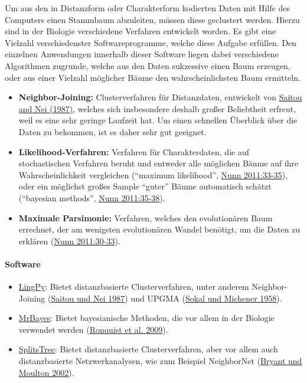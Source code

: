 Um aus den in Distanzform oder Charakterform kodierten Daten mit Hilfe
des Computers einen Stammbaum abzuleiten, müssen diese geclustert
werden. Hierzu sind in der Biologie verschiedene Verfahren entwickelt
worden. Es gibt eine Vielzahl verschiedenster Softwareprogramme, welche
diese Aufgabe erfüllen. Den einzelnen Anwendungen innerhalb dieser
Software liegen dabei verschiedene Algorithmen zugrunde, welche aus den
Daten sukzessive einen Baum erzeugen, oder aus einer Vielzahl möglicher
Bäume den wahrscheinlichsten Baum ermitteln.




\begin{itemize}
\itemsep1pt\parskip0pt
\item
  \textbf{Neighbor-Joining:} Clusterverfahren für Distanzdaten,
  entwickelt von
  \href{http://bibliography.lingpy.org?key=Saitou1987}{Saitou and Nei
  (1987)}, welches sich insbesondere deshalb großer Beliebtheit erfreut,
  weil es eine sehr geringe Laufzeit hat. Um einen schnellen Überblick
  über die Daten zu bekommen, ist es daher sehr gut geeignet.
\item
  \textbf{Likelihood-Verfahren:} Verfahren für Charakterdaten, die auf
  stochastischen Verfahren beruht und entweder alle möglichen Bäume auf
  ihre Wahrscheinlichkeit vergleichen (``maximum likelihood'',
  \href{http://bibliography.lingpy.org?key=Nunn2011}{Nunn 2011:33-35}),
  oder ein möglichst großes Sample ``guter'' Bäume automatisch schätzt
  (``bayesian methods'',
  \href{http://bibliography.lingpy.org?key=Nunn2011}{Nunn 2011:35-38}).
\item
  \textbf{Maximale Parsimonie:} Verfahren, welches den evolutionären
  Baum errechnet, der am wenigsten evolutionären Wandel benötigt, um die
  Daten zu erklären
  (\href{http://bibliography.lingpy.org?key=Nunn2011}{Nunn 2011:30-33}).
\end{itemize}




\paragraph{Software}

\begin{itemize}
\itemsep1pt\parskip0pt
\item
  \href{http://lingpy.org}{LingPy}: Bietet distanzbasierte
  Clusterverfahren, unter anderem Neighbor-Joining
  (\href{http://bibliography.lingpy.org?key=Saitou1987}{Saitou und Nei
  1987}) und UPGMA
  (\href{http://bibliography.lingpy.org?key=Sokal1958}{Sokal und
  Michener 1958}).
\item
  \href{http://mrbayes.sourceforge.net}{MrBayes}: Bietet bayesianische
  Methoden, die vor allem in der Biologie verwendet werden
  (\href{http://bibliography.lingpy.org?key=Ronquist2009}{Ronquist et
  al. 2009}).
\item
  \href{http://splitstree.org}{SplitsTree}: Bietet distanzbasierte
  Clusterverfahren, aber vor allem auch distanzbasierte
  Netzwerkanalysen, wie zum Beispiel NeighborNet
  (\href{http://bibliography.lingpy.org?key=Bryant2002}{Bryant und
  Moulton 2002}).
\end{itemize}



